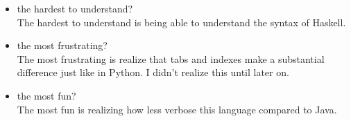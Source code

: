 \documentclass{article}
\begin{document}
\begin{enumerate}
\begin{itemize}
\\
\item the hardest to understand?
\\
The hardest to understand is being able to understand the syntax of Haskell.
\\
\item the most frustrating?
\\
The most frustrating is realize that tabs and indexes make a substantial difference just like in Python. I didn't realize this until later on.
\\
\item the most fun?
\\
The most fun is realizing how less verbose this language compared to Java.
\end{itemize}
\end{enumerate}
\end{document}
